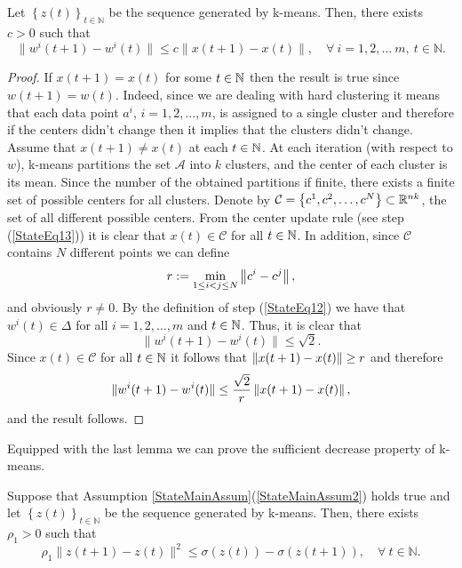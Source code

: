 \begin{lemma} \label{StateLemma_x_bounds_w}
Let $\left\lbrace z(t) \right\rbrace_{t \in \mathbb{N}}$ be the sequence generated by k-means. Then, there exists $c > 0$ such that
\begin{equation*}
	\|w^i(t+1)-w^i(t)\| \leq c \|x(t+1)-x(t)\| , \quad \forall \: i=1,2, \ldots\ m, \: t \in \mathbb{N} .
\end{equation*}
\end{lemma}

\begin{proof}
If $x(t+1)=x(t)$ for some $t \in \mathbb{N}$ then the result is true since $w(t+1)=w(t)$. Indeed, since we are dealing with hard clustering it means that each data point $a^i$, $i=1,2,\ldots,m$, is assigned to a single cluster and therefore if the centers didn't change then it implies that the clusters didn't change. Assume that $x(t+1) \neq x(t)$ at each $t \in \mathbb{N}$. At each iteration (with respect to $w$), k-means partitions the set $\mathcal{A}$ into $k$ clusters, and the center of each cluster is its mean. Since the number of the obtained partitions if finite, there exists a finite set of possible centers for all clusters. Denote by $\mathcal{C} =\left\lbrace c^1,c^2,\ldots,c^N \right\rbrace \subset \mathbb{R}^{nk}$, the set of all different possible centers. From the center update rule (see step (\ref{StateEq13})) it is clear that $x(t)\in \mathcal{C}$ for all $t\in \mathbb{N}$. In addition, since $\mathcal{C}$ contains $N$ different points we can define
\begin{equation*}
	r:=\min\limits_{1 \leq i <j \leq N} \left\Vert {c^i - c^j} \right\Vert,
\end{equation*}
and obviously $r \neq 0$. By the definition of step (\ref{StateEq12}) we have that $w^i(t)\in\Delta$ for all $i=1,2,\ldots,m$ and $t \in \mathbb{N}$. Thus, it is clear that
\begin{equation*}
	\|w^i(t+1)-w^i(t)\| \leq \sqrt{2}.
\end{equation*}
Since $x(t) \in \mathcal{C}$ for all $t \in \mathbb{N}$ it follows that $\left\Vert {x(t+1)-x(t)} \right\Vert \geq r$ and therefore
\begin{equation*}
	\|w^i(t+1)-w^i(t)\| \leq \frac{\sqrt{2}}{r}\left\Vert {x(t+1)-x(t)} \right\Vert,
\end{equation*}
and the result follows.
\end{proof}

Equipped with the last lemma we can prove the sufficient decrease property of k-means.

\begin{proposition} \label{k_means_SDP}
Suppose that Assumption \ref{StateMainAssum}(\ref{StateMainAssum2}) holds true and let $\left\lbrace z(t) \right\rbrace_{t \in \mathbb{N}}$ be the sequence generated by k-means. Then, there exists $\rho_1 > 0$ such that 
\begin{equation*}
	\rho_1 \|z(t+1) - z(t)\|^2 \leq \sigma(z(t)) - \sigma(z(t+1)), \quad \forall \: t \in \mathbb{N} .
\end{equation*}
\end{proposition}

